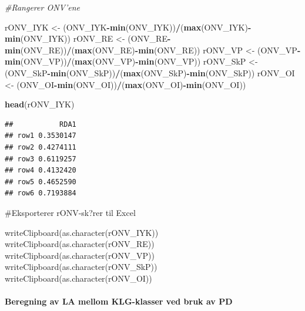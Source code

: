 \documentclass[]{article}
\newenvironment{Shaded}{\begin{snugshade}}{\end{snugshade}}
\newcommand{\CommentTok}[1]{\textcolor[rgb]{0.56,0.35,0.01}{\textit{#1}}}
\newcommand{\KeywordTok}[1]{\textcolor[rgb]{0.13,0.29,0.53}{\textbf{#1}}}
\newcommand{\NormalTok}[1]{#1}
\newcommand{\OperatorTok}[1]{\textcolor[rgb]{0.81,0.36,0.00}{\textbf{#1}}}
\newcommand{\StringTok}[1]{\textcolor[rgb]{0.31,0.60,0.02}{#1}}
\let\oldparagraph\paragraph
\renewcommand{\paragraph}[1]{\oldparagraph{#1}\mbox{}}
\begin{document}
\begin{Shaded}
\begin{Highlighting}[]
\CommentTok{#Rangerer ONV'ene}

\NormalTok{rONV_IYK <-}\StringTok{ }\NormalTok{(ONV_IYK}\OperatorTok{-}\KeywordTok{min}\NormalTok{(ONV_IYK))}\OperatorTok{/}\NormalTok{(}\KeywordTok{max}\NormalTok{(ONV_IYK)}\OperatorTok{-}\KeywordTok{min}\NormalTok{(ONV_IYK))}
\NormalTok{rONV_RE <-}\StringTok{ }\NormalTok{(ONV_RE}\OperatorTok{-}\KeywordTok{min}\NormalTok{(ONV_RE))}\OperatorTok{/}\NormalTok{(}\KeywordTok{max}\NormalTok{(ONV_RE)}\OperatorTok{-}\KeywordTok{min}\NormalTok{(ONV_RE))}
\NormalTok{rONV_VP <-}\StringTok{ }\NormalTok{(ONV_VP}\OperatorTok{-}\KeywordTok{min}\NormalTok{(ONV_VP))}\OperatorTok{/}\NormalTok{(}\KeywordTok{max}\NormalTok{(ONV_VP)}\OperatorTok{-}\KeywordTok{min}\NormalTok{(ONV_VP))}
\NormalTok{rONV_SkP <-}\StringTok{ }\NormalTok{(ONV_SkP}\OperatorTok{-}\KeywordTok{min}\NormalTok{(ONV_SkP))}\OperatorTok{/}\NormalTok{(}\KeywordTok{max}\NormalTok{(ONV_SkP)}\OperatorTok{-}\KeywordTok{min}\NormalTok{(ONV_SkP))}
\NormalTok{rONV_OI <-}\StringTok{ }\NormalTok{(ONV_OI}\OperatorTok{-}\KeywordTok{min}\NormalTok{(ONV_OI))}\OperatorTok{/}\NormalTok{(}\KeywordTok{max}\NormalTok{(ONV_OI)}\OperatorTok{-}\KeywordTok{min}\NormalTok{(ONV_OI))}
\end{Highlighting}
\end{Shaded}

\begin{Shaded}
\begin{Highlighting}[]
\KeywordTok{head}\NormalTok{(rONV_IYK)}
\end{Highlighting}
\end{Shaded}

\begin{verbatim}
##           RDA1
## row1 0.3530147
## row2 0.4274111
## row3 0.6119257
## row4 0.4132420
## row5 0.4652590
## row6 0.7193884
\end{verbatim}

\#Eksporterer rONV-sk?rer til Excel

writeClipboard(as.character(rONV\_IYK))
writeClipboard(as.character(rONV\_RE))
writeClipboard(as.character(rONV\_VP))
writeClipboard(as.character(rONV\_SkP))
writeClipboard(as.character(rONV\_OI))

\hypertarget{beregning-av-la-mellom-klg-klasser-ved-bruk-av-pd}{%
\paragraph{Beregning av LA mellom KLG-klasser ved bruk av
PD}\label{beregning-av-la-mellom-klg-klasser-ved-bruk-av-pd}}
\end{document}
